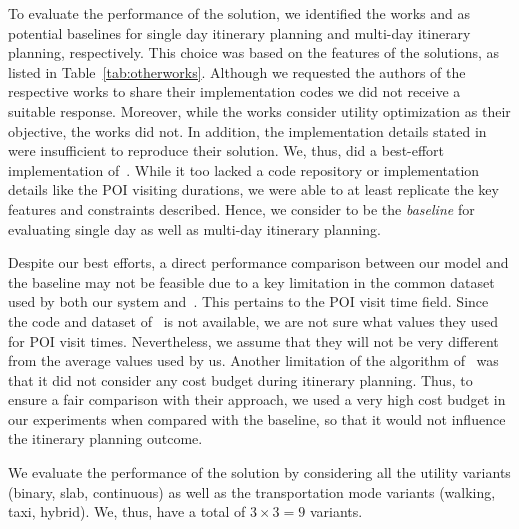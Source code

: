 To evaluate the performance of the \trip solution, we identified the works \cite{bolzoni2014efficient,taylor2018tour} and \cite{chen2014automatic,vanzelst2016itinerary} as potential baselines for single day itinerary planning and multi-day itinerary planning, respectively. This choice was based on the features of the solutions, as listed in Table~\ref{tab:otherworks}. Although we requested the authors of the respective works to share their implementation codes we did not receive a suitable response. Moreover, while the works \cite{bolzoni2014efficient,taylor2018tour}  consider utility optimization as their objective, the works \cite{chen2014automatic,vanzelst2016itinerary} did not. In addition, the implementation details stated in \cite{bolzoni2014efficient} were insufficient to reproduce their solution.  We, thus, did a best-effort implementation of~\cite{taylor2018tour}. While it too lacked a code repository or implementation details like the POI visiting durations, we were able to at least replicate the key features and constraints described. 
Hence, we consider \cite{taylor2018tour} to be the  \emph{baseline} for evaluating single day as well as multi-day itinerary planning.

Despite our best efforts, a direct performance comparison between our model and the baseline may not be
feasible due to a key limitation in the common dataset used by both our
system and~\cite{taylor2018tour}.
This pertains to the POI visit time field.
Since the code and dataset of~\cite{taylor2018tour} is not available, we are not sure what values they used for POI visit times.
Nevertheless, we assume that they will not be very different from the average values used by us.
Another limitation of the algorithm of~\cite{taylor2018tour} was that it did not consider any cost budget during
itinerary planning.
Thus, to ensure a fair comparison with their approach, we used a very
high cost budget in our experiments when compared with the baseline, so that
it would not influence the itinerary planning outcome.


We evaluate the performance of the \trip solution by considering all the utility variants (binary, slab, continuous) as well as the transportation mode variants (walking, taxi, hybrid). We, thus, have a total of $3 \times 3 = 9$ \trip variants.

